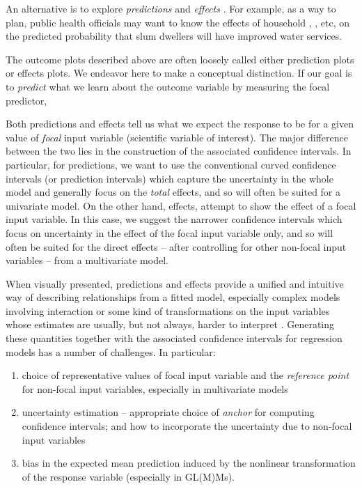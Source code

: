 
An alternative is to explore \emph{predictions} and \emph{effects} \citep{fox2009effect, leeper2017package, lenth2018package}.  For example, as a way to plan, public health officials may want to know the effects of household , , etc, on the predicted probability that slum dwellers will have improved water services. 


The outcome plots described above are often loosely called either prediction plots or effects plots.
We endeavor here to make a conceptual distinction.
If our goal is to \emph{predict} what we learn about the outcome variable by measuring the focal predictor, 

Both predictions and effects tell us what we expect the response to be for a given value of \emph{focal} input variable (scientific variable of interest). The major difference between the two lies in the construction of the associated confidence intervals. In particular, for predictions, we want to use the conventional curved confidence intervals (or prediction intervals) which capture the uncertainty in the whole model and generally focus on the \emph{total} effects, and so will often be suited for a univariate model. On the other hand, effects, attempt to show the effect of a focal input variable. In this case, we suggest the narrower confidence intervals which focus on uncertainty in the effect of the focal input variable only, and so will often be suited for the direct effects – after controlling for other non-focal input variables – from a multivariate model.

When visually presented, predictions and effects provide a unified and intuitive way of describing relationships from a fitted model, especially complex models involving interaction or some kind of transformations on the input variables whose estimates are usually, but not always, harder to interpret . Generating these quantities together with the associated confidence intervals for regression models has a number of challenges. In particular:
\begin{enumerate}
\item choice of representative values of focal input variable and the \emph{reference point} for non-focal input variables, especially in multivariate models
\item  uncertainty estimation -- appropriate choice of \emph{anchor} for computing confidence intervals; and how to incorporate the uncertainty due to non-focal input variables 
\item bias in the expected mean prediction induced by the nonlinear transformation of the response variable (especially in GL(M)Ms).
\end{enumerate}


